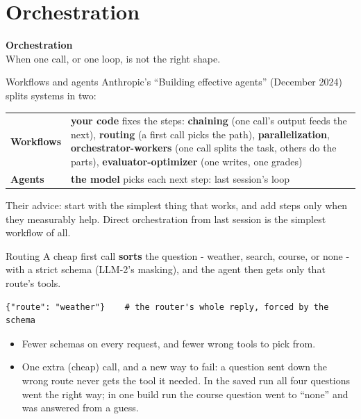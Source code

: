 \documentclass[aspectratio=169]{beamer}
\newcommand{\keybox}[1]{%
  \begin{tcolorbox}[colback=armblue!8, colframe=armblue, boxrule=0.6pt, arc=2pt]
  #1
  \end{tcolorbox}}
\newcommand{\sectiontransition}[2]{%
  \begin{frame}[plain]
    \vfill
    \begin{center}
      {\Huge\bfseries\color{popblue} #1}\\[1.1em]
      {\large #2}
    \end{center}
    \vfill
  \end{frame}}
\begin{document}
\section{Orchestration}
\sectiontransition{Orchestration}{When one call, or one loop, is not the right shape.}

\begin{frame}{Workflows and agents}
  \vspace{0.3em}
  {\small Anthropic's ``Building effective agents'' (December 2024) splits systems in two:}

  \vspace{0.4em}
  \begin{center}
  \small
  \begin{tabular}{>{\raggedright\arraybackslash}p{}>{\raggedright\arraybackslash}p{}}
    \toprule
    \textbf{Workflows} & \textbf{your code} fixes the steps: \textbf{chaining} (one call's output feeds the next),
      \textbf{routing} (a first call picks the path), \textbf{parallelization}, \textbf{orchestrator-workers}
      (one call splits the task, others do the parts), \textbf{evaluator-optimizer} (one writes, one grades) \\[0.3em]
    \textbf{Agents} & \textbf{the model} picks each next step: last session's loop \\
    \bottomrule
  \end{tabular}
  \end{center}

  \vspace{0.4em}
  \keybox{\small Their advice: start with the simplest thing that works, and add steps only when they measurably
  help. Direct orchestration from last session is the simplest workflow of all.}
\end{frame}


\begin{frame}[fragile]{Routing}
  \vspace{0.5em}
  A cheap first call \textbf{sorts} the question - weather, search, course, or none - with a strict schema
  (LLM-2's masking), and the agent then gets only that route's tools.

  \begin{lstlisting}
{"route": "weather"}    # the router's whole reply, forced by the schema
\end{lstlisting}

  \begin{itemize}
    \item Fewer schemas on every request, and fewer wrong tools to pick from.
    \item One extra (cheap) call, and a new way to fail: a question sent down the wrong route never gets the tool
      it needed. In the saved run all four questions went the right way; in one build run the course question
      went to ``none'' and was answered from a guess.
  \end{itemize}
\end{frame}
\end{document}

